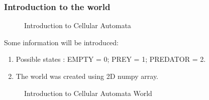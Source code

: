 \documentclass{article}
\begin{document}
\begin{normalsize}
\subsubsection{Introduction to the world}
\begin{figure}[H]
	\caption{Introduction to Cellular Automata}
\end{figure}
Some information will be introduced:
\begin{enumerate}
	\item Possible states : EMPTY = 0; PREY = 1; PREDATOR = 2.
	\item The world was created using 2D numpy array. 
\end{enumerate}
\begin{figure}[H]
	\caption{Introduction to Cellular Automata World}
\end{figure}

\end{normalsize}
\end{document}
